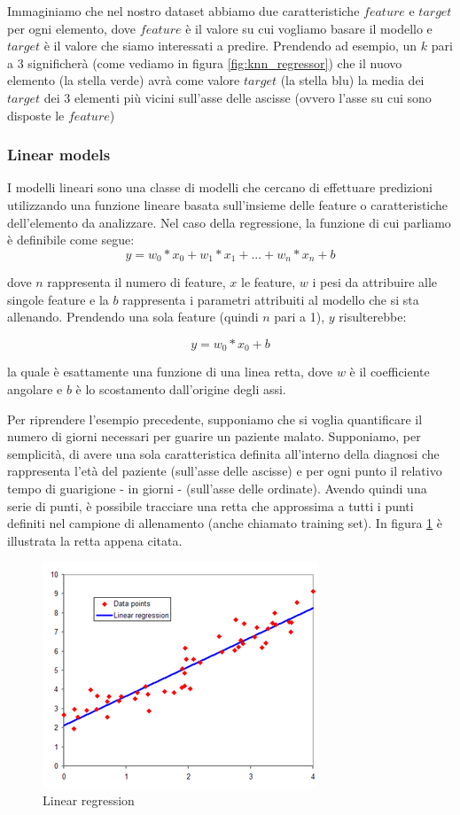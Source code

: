 \documentclass[12pt,italian]{report}
\begin{document}
Immaginiamo che nel nostro dataset abbiamo due caratteristiche $ feature $ e $target$ per ogni elemento, dove $feature $ è il valore su cui vogliamo basare il modello e $target$ è il valore che siamo interessati a predire. Prendendo ad esempio, un $ k $ pari a 3 significherà (come vediamo in figura \ref{fig:knn_regressor}) che il nuovo elemento (la stella verde) avrà come valore $ target $ (la stella blu) la media dei $ target $ dei 3  elementi più vicini sull'asse delle ascisse (ovvero l'asse su cui sono disposte le $feature$)



\pagebreak
\subsubsection{Linear models}
I modelli lineari sono una classe di modelli che cercano di effettuare predizioni utilizzando una funzione lineare basata sull'insieme delle feature o caratteristiche dell'elemento da analizzare. 
Nel caso della regressione, la funzione di cui parliamo è definibile come segue:
\[ y = w_{0} * x_{0} + w_{1} * x_{1} + ... + w_{n} * x_{n} + b \]


dove $n$ rappresenta il numero di feature, $x$ le feature, $ w $ i pesi da attribuire alle singole feature e la $ b $ rappresenta i parametri attribuiti al modello che si sta allenando.
Prendendo una sola feature (quindi $ n $ pari a 1), $ y $ risulterebbe:

\[ y = w_{0} * x_{0} + b\]

la quale è esattamente una funzione di una linea retta, dove $ w $ è il coefficiente angolare e $ b $ è lo scostamento dall'origine degli assi.

Per riprendere l'esempio precedente, supponiamo che si voglia quantificare il numero di giorni necessari per guarire un paziente malato.
Supponiamo, per semplicità, di avere una sola caratteristica definita all'interno della diagnosi che rappresenta l'età del paziente (sull'asse delle ascisse) e per ogni punto il relativo tempo di guarigione - in giorni - (sull'asse delle ordinate). 
Avendo quindi una serie di punti, è possibile tracciare una retta che approssima a tutti i punti definiti nel campione di allenamento (anche chiamato training set). In figura \ref{fig:linear_regression} è illustrata la retta appena citata.

\begin{figure}[h!]
	\center
	\includegraphics[scale=0.6]{../img/linear_regression}
	\caption{Linear regression}
	\label{fig:linear_regression}
\end{figure}
\end{document}
